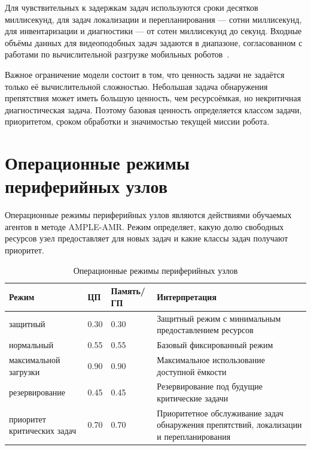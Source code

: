 Для чувствительных к задержкам задач используются сроки десятков миллисекунд, для задач локализации и перепланирования --- сотни миллисекунд, для инвентаризации и диагностики --- от сотен миллисекунд до секунд. Входные объёмы данных для видеоподобных задач задаются в диапазоне, согласованном с работами по вычислительной разгрузке мобильных роботов~\cite{Baruffa2025AMRResourceAssignment}.

Важное ограничение модели состоит в том, что ценность задачи не задаётся только её вычислительной сложностью. Небольшая задача обнаружения препятствия может иметь большую ценность, чем ресурсоёмкая, но некритичная диагностическая задача. Поэтому базовая ценность определяется классом задачи, приоритетом, сроком обработки и значимостью текущей миссии робота.

\section{Операционные режимы периферийных узлов}

Операционные режимы периферийных узлов являются действиями обучаемых агентов в методе AMPLE-AMR. Режим определяет, какую долю свободных ресурсов узел предоставляет для новых задач и какие классы задач получают приоритет.

\begin{table}[h]
	\centering
	\small
	\caption{Операционные режимы периферийных узлов}
	\label{tab:operation_modes_final}
	\begin{tabular}{|p{}|p{}|p{}|p{}|}
		\hline
		\textbf{Режим} & \textbf{ЦП} & \textbf{Память/ГП} & \textbf{Интерпретация} \\
		\hline
		защитный & 0.30 & 0.30 & Защитный режим с минимальным предоставлением ресурсов \\
		\hline
		нормальный & 0.55 & 0.55 & Базовый фиксированный режим \\
		\hline
		максимальной загрузки & 0.90 & 0.90 & Максимальное использование доступной ёмкости \\
		\hline
		резервирование & 0.45 & 0.45 & Резервирование под будущие критические задачи \\
		\hline
		приоритет критических задач & 0.70 & 0.70 & Приоритетное обслуживание задач обнаружения препятствий, локализации и перепланирования \\
		\hline
	\end{tabular}
\end{table}

